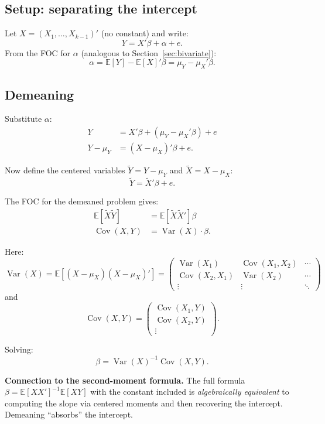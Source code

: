\documentclass[12pt]{article}
\newcommand{\E}{\mathbb{E}}
\newcommand{\Var}{\operatorname{Var}}
\newcommand{\Cov}{\operatorname{Cov}}
\theoremstyle{definition}
\begin{document}
\subsection{Setup: separating the intercept}

Let $X = (X_1, \ldots, X_{k-1})'$ (no constant) and write:
\[
Y = X'\beta + \alpha + e.
\]
From the FOC for $\alpha$ (analogous to Section~\ref{sec:bivariate}):
\[
\alpha = \E[Y] - \E[X]'\beta = \mu_Y - \mu_X'\beta.
\]

\subsection{Demeaning}

Substitute $\alpha$:
\begin{align*}
Y &= X'\beta + (\mu_Y - \mu_X'\beta) + e\\
Y - \mu_Y &= (X - \mu_X)'\beta + e.
\end{align*}

Now define the centered variables $\tilde{Y} = Y - \mu_Y$ and $\tilde{X} = X - \mu_X$:
\[
\tilde{Y} = \tilde{X}'\beta + e.
\]

The FOC for the demeaned problem gives:
\begin{align*}
\E[\tilde{X}\tilde{Y}] &= \E[\tilde{X}\tilde{X}']\beta\\
\Cov(X,Y) &= \Var(X) \cdot \beta.
\end{align*}

Here:
\[
\Var(X) = \E[(X - \mu_X)(X - \mu_X)'] =
\begin{pmatrix}
\Var(X_1) & \Cov(X_1,X_2) & \cdots \\
\Cov(X_2,X_1) & \Var(X_2) & \cdots \\
\vdots & \vdots & \ddots
\end{pmatrix}
\]
and
\[
\Cov(X,Y) =
\begin{pmatrix}
\Cov(X_1, Y) \\
\Cov(X_2, Y) \\
\vdots
\end{pmatrix}.
\]

Solving:
\begin{equation}
\boxed{\beta = \Var(X)^{-1}\Cov(X,Y).}
\end{equation}

\textbf{Connection to the second-moment formula.}  The full formula $\beta = \E[XX']^{-1}\E[XY]$ with the constant included is \emph{algebraically equivalent} to computing the slope via centered moments and then recovering the intercept. Demeaning ``absorbs'' the intercept.
\end{document}
